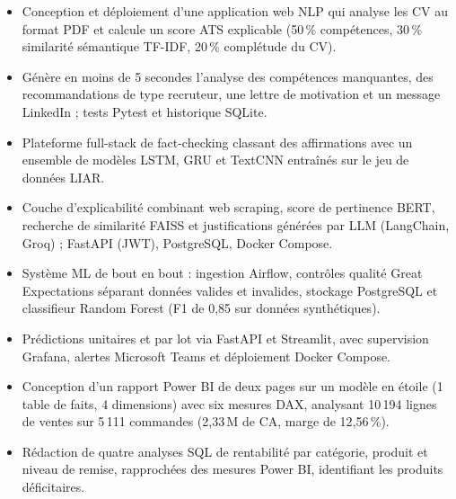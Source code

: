 \begin{itemize}
  \item Conception et déploiement d'une application web NLP qui analyse les CV au format PDF et calcule un score ATS explicable (50\,\% compétences, 30\,\% similarité sémantique TF-IDF, 20\,\% complétude du CV).
  \item Génère en moins de 5 secondes l'analyse des compétences manquantes, des recommandations de type recruteur, une lettre de motivation et un message LinkedIn ; tests Pytest et historique SQLite.
\end{itemize}

\begin{itemize}
  \item Plateforme full-stack de fact-checking classant des affirmations avec un ensemble de modèles LSTM, GRU et TextCNN entraînés sur le jeu de données LIAR.
  \item Couche d'explicabilité combinant web scraping, score de pertinence BERT, recherche de similarité FAISS et justifications générées par LLM (LangChain, Groq) ; FastAPI (JWT), PostgreSQL, Docker Compose.
\end{itemize}

\begin{itemize}
  \item Système ML de bout en bout : ingestion Airflow, contrôles qualité Great Expectations séparant données valides et invalides, stockage PostgreSQL et classifieur Random Forest (F1 de 0,85 sur données synthétiques).
  \item Prédictions unitaires et par lot via FastAPI et Streamlit, avec supervision Grafana, alertes Microsoft Teams et déploiement Docker Compose.
\end{itemize}

\begin{itemize}
  \item Conception d'un rapport Power BI de deux pages sur un modèle en étoile (1 table de faits, 4 dimensions) avec six mesures DAX, analysant 10\,194 lignes de ventes sur 5\,111 commandes (2,33\,M de CA, marge de 12,56\,\%).
  \item Rédaction de quatre analyses SQL de rentabilité par catégorie, produit et niveau de remise, rapprochées des mesures Power BI, identifiant les produits déficitaires.
\end{itemize}

